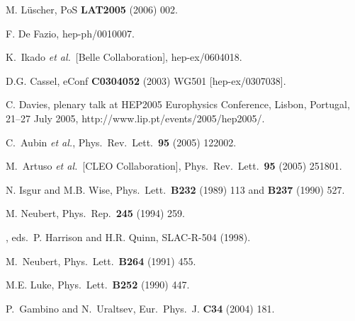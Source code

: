 \documentclass[11pt]{cernrep}
\begin{document}
\begin{thebibliography}{999}
M. L\"uscher,
  PoS {\bf LAT2005} (2006) 002.

F. De Fazio,
hep-ph/0010007.

 K.~Ikado {\it et al.}~[Belle Collaboration],
  hep-ex/0604018.
  
D.G. Cassel,
eConf {\bf C0304052} (2003) WG501 [hep-ex/0307038].

C. Davies, plenary talk at HEP2005 Europhysics Conference, 
Lisbon, Portugal, 21--27 July 2005, http://www.lip.pt/events/2005/hep2005/.
  
 C.~Aubin {\it et al.},
  Phys.\ Rev.\ Lett.\  {\bf 95} (2005) 122002.

 M.~Artuso {\it et al.}\  [CLEO Collaboration],
  Phys.\ Rev.\ Lett.\  {\bf 95} (2005) 251801.

N. Isgur and M.B. Wise,
{ Phys.\ Lett.}~{\bf B232} (1989) 113 and
{\bf B237} (1990) 527.

M. Neubert, { Phys.\ Rep.}~{\bf 245} (1994) 259.

, eds.\ P. Harrison and
H.R. Quinn, SLAC-R-504 (1998).

M.~Neubert,
{ Phys.\ Lett.}~{\bf B264} (1991) 455.

M.E. Luke,
{ Phys.\ Lett.}~{\bf B252} (1990) 447.

  P.~Gambino and N.~Uraltsev,
  { Eur.\ Phys.\ J.} {\bf C34} (2004) 181.


\end{thebibliography}
\end{document}
